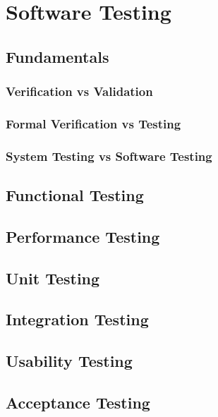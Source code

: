 \chapter{Software Testing}


\section{Fundamentals}


\subsection{Verification vs Validation}


\subsection{Formal Verification vs Testing}


\subsection{System Testing vs Software Testing}


\section{Functional Testing}


\section{Performance Testing}


\section{Unit Testing}


\section{Integration Testing}


\section{Usability Testing}


\section{Acceptance Testing}
